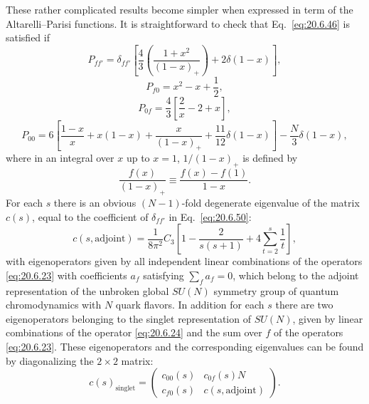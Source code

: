 These rather complicated results become simpler when expressed in term of the Altarelli--Parisi functions. It is straightforward to check that Eq.~\eqref{eq:20.6.46} is satisfied if
\begin{equation}
P_{ff'}
=\delta_{ff'}
\left[
\frac43\left(\frac{1+x^2}{(1-x)_+}\right)
+2\delta(1-x)
\right],
\tag{20.6.53}\label{eq:20.6.53}
\end{equation}
\begin{equation}
P_{f0}=x^2-x+\frac12,
\tag{20.6.54}\label{eq:20.6.54}
\end{equation}
\begin{equation}
P_{0f}=\frac43\left[\frac2x-2+x\right],
\tag{20.6.55}\label{eq:20.6.55}
\end{equation}
\begin{equation}
P_{00}
=6\left[
\frac{1-x}{x}
+x(1-x)
+\frac{x}{(1-x)_+}
+\frac{11}{12}\delta(1-x)
\right]
-\frac N3\delta(1-x),
\tag{20.6.56}\label{eq:20.6.56}
\end{equation}
where in an integral over $x$ up to $x=1$, $1/(1-x)_+$ is defined by
\begin{equation}
\frac{f(x)}{(1-x)_+}
\equiv
\frac{f(x)-f(1)}{1-x}.
\tag{20.6.57}\label{eq:20.6.57}
\end{equation}
For each $s$ there is an obvious $(N-1)$-fold degenerate eigenvalue of the matrix $c(s)$, equal to the coefficient of $\delta_{ff'}$ in Eq.~\eqref{eq:20.6.50}:
\begin{equation}
c(s,\text{adjoint})
=\frac{1}{8\pi^2}C_3
\left[
1-\frac{2}{s(s+1)}
+4\sum_{t=2}^s\frac1t
\right],
\tag{20.6.58}\label{eq:20.6.58}
\end{equation}
with eigenoperators given by all independent linear combinations of the operators \eqref{eq:20.6.23} with coefficients $a_f$ satisfying $\sum_fa_f=0$, which belong to the adjoint representation of the unbroken global $SU(N)$ symmetry group of quantum chromodynamics with $N$ quark flavors. In addition for each $s$ there are two eigenoperators belonging to the singlet representation of $SU(N)$, given by linear combinations of the operator \eqref{eq:20.6.24} and the sum over $f$ of the operators \eqref{eq:20.6.23}. These eigenoperators and the corresponding eigenvalues can be found by diagonalizing the $2\times2$ matrix:
\begin{equation}
c(s)_{\mathrm{singlet}}
=
\begin{pmatrix}
c_{00}(s)&c_{0f}(s)N\\
c_{f0}(s)&c(s,\text{adjoint})
\end{pmatrix}.
\tag{20.6.59}\label{eq:20.6.59}
\end{equation}
